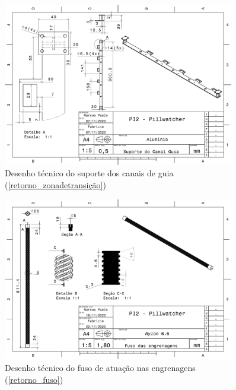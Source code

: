 \begin{apendicesenv}
\begin{figure}[H]
    \centering
    \includegraphics[width=0.9\textwidth]{figuras/estrutura/Desenhos/Suporte_Canal_Guia.pdf}
    \caption{Desenho técnico do suporte dos canais de guia (\ref{retorno_zonadetransição})}
    \label{fig:supp_canal}
\end{figure}

\begin{figure}[H]
    \centering
    \includegraphics[width=0.9\textwidth]{figuras/estrutura/Desenhos/Fuso_Engrenagens_V2.pdf}
    \caption{Desenho técnico do fuso de atuação nas engrenagens (\ref{retorno_fuso})}
    \label{fig:fuso}
\end{figure}


\end{apendicesenv}
